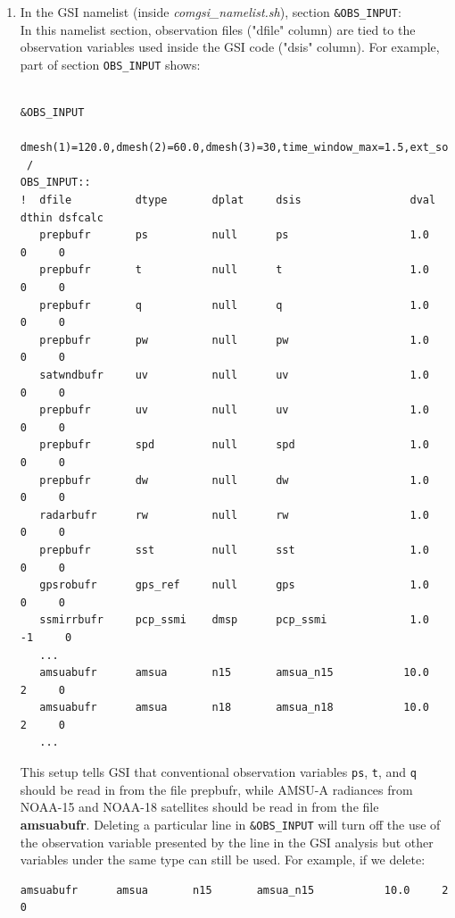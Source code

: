 \begin{enumerate}[leftmargin=*]
\item In the GSI namelist (inside \textit{comgsi\_namelist.sh}), section \verb|&OBS_INPUT|:\\

In this namelist section, observation files ("dfile" column) are tied to the observation variables used inside the GSI code ("dsis" column). For example, part of section \verb|OBS_INPUT| shows:

\begin{scriptsize}
\begin{verbatim}

&OBS_INPUT
   dmesh(1)=120.0,dmesh(2)=60.0,dmesh(3)=30,time_window_max=1.5,ext_sonde=.true.,
 /
OBS_INPUT::
!  dfile          dtype       dplat     dsis                 dval    dthin dsfcalc
   prepbufr       ps          null      ps                   1.0     0     0
   prepbufr       t           null      t                    1.0     0     0
   prepbufr       q           null      q                    1.0     0     0
   prepbufr       pw          null      pw                   1.0     0     0
   satwndbufr     uv          null      uv                   1.0     0     0
   prepbufr       uv          null      uv                   1.0     0     0
   prepbufr       spd         null      spd                  1.0     0     0
   prepbufr       dw          null      dw                   1.0     0     0
   radarbufr      rw          null      rw                   1.0     0     0
   prepbufr       sst         null      sst                  1.0     0     0
   gpsrobufr      gps_ref     null      gps                  1.0     0     0
   ssmirrbufr     pcp_ssmi    dmsp      pcp_ssmi             1.0    -1     0
   ...
   amsuabufr      amsua       n15       amsua_n15           10.0     2     0
   amsuabufr      amsua       n18       amsua_n18           10.0     2     0
   ...
\end{verbatim}
\end{scriptsize}

This setup tells GSI that conventional observation variables \verb|ps|, \verb|t|, and \verb|q| should be read in from the file prepbufr, while AMSU-A radiances from NOAA-15 and NOAA-18 satellites should be read in from the file \textbf{amsuabufr}. Deleting a particular line in \verb|&OBS_INPUT| will turn off the use of the observation variable presented by the line in the GSI analysis but other variables under the same type can still be used. For example, if we delete: 

\begin{scriptsize}
\begin{verbatim}
amsuabufr      amsua       n15       amsua_n15           10.0     2     0
\end{verbatim}
\end{scriptsize}


\end{enumerate}
